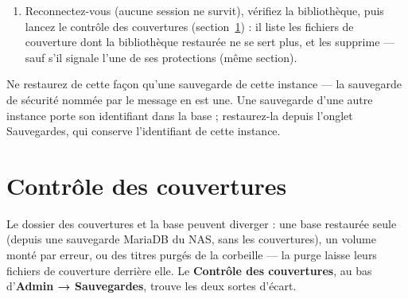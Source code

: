 \begin{enumerate}
        et mybibli redémarre en dernier :
\begin{lstlisting}
docker compose stop mybibli && sudo rm -f backups/database.sql \
&& sudo sh -c 'cd backups && sha256sum -c mybibli-<id>-<stamp>.tar.gz.sha256 \
    && tar -xzf mybibli-<id>-<stamp>.tar.gz database.sql' \
&& sudo test -s backups/database.sql \
&& docker compose exec -T db \
    sh -c 'mariadb -u root -p"$MYSQL_ROOT_PASSWORD" \
    -e "DROP DATABASE $MYSQL_DATABASE;
        CREATE DATABASE $MYSQL_DATABASE CHARACTER SET utf8mb4;"' \
&& sudo cat backups/database.sql | docker compose exec -T db \
    sh -c 'exec mariadb -u root -p"$MYSQL_ROOT_PASSWORD" "$MYSQL_DATABASE"' \
&& docker compose run --rm --no-deps --entrypoint sh mybibli -c \
    'mkdir -p /tmp/x/covers && tar -xzf /app/backups/mybibli-<id>-<stamp>.tar.gz \
     -C /tmp/x && cp -a /tmp/x/covers/. /app/covers/' \
&& sudo rm backups/database.sql backups/.restore-in-progress.json \
&& docker compose start mybibli
\end{lstlisting}
        L'étape \texttt{run} utilise l'image de mybibli avec ses propres
        volumes : elle trouve les couvertures où qu'elles soient montées.
        Si la chaîne s'arrête, lisez le dernier message, corrigez la
        cause et relancez-la en entier. Avec
        une base externe, lancez les deux étapes \texttt{mariadb} sur ce
        serveur.
  \item Reconnectez-vous (aucune session ne survit), vérifiez la
        bibliothèque, puis lancez le contrôle des couvertures
        (section~\ref{sec:cover-check}) : il liste les fichiers de
        couverture dont la bibliothèque restaurée ne se sert plus, et
        les supprime --- sauf s'il signale l'une de ses protections (même
        section).
\end{enumerate}

Ne restaurez de cette façon qu'une sauvegarde de cette instance --- la
sauvegarde de sécurité nommée par le message en est une. Une sauvegarde
d'une autre instance porte son identifiant dans la base ; restaurez-la
depuis l'onglet Sauvegardes, qui conserve l'identifiant de cette
instance.

\section{Contrôle des couvertures}
\label{sec:cover-check}
\index{couvertures!contrôle}\index{contrôle des couvertures}

Le dossier des couvertures et la base peuvent diverger : une base
restaurée seule (depuis une sauvegarde MariaDB du NAS, sans les
couvertures), un volume monté par erreur, ou des titres purgés de la
corbeille --- la purge laisse leurs fichiers de couverture derrière
elle. Le \textbf{Contrôle des couvertures}, au bas d'\textbf{Admin →
Sauvegardes}, trouve les deux sortes d'écart.

